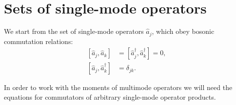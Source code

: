 \section{Sets of single-mode operators}

We start from the set of single-mode operators $\hat{a}_j$, which obey bosonic commutation relations:
\begin{equation}
\label{eqn:formalism:mm-aux:commutators}
\begin{split}
	[ \hat{a}_j, \hat{a}_k ] & = [ \hat{a}_j^\dagger, \hat{a}_k^\dagger ] = 0, \\
	[ \hat{a}_j, \hat{a}_k^\dagger ] & = \delta_{jk}.
\end{split}
\end{equation}

In order to work with the moments of multimode operators we will need the equations for commutators of arbitrary single-mode operator products.

